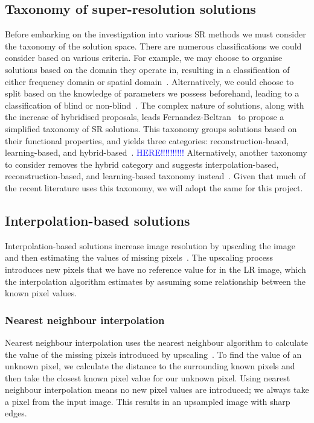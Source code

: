 \subsection{Taxonomy of super-resolution solutions}
Before embarking on the investigation into various SR methods we must consider the taxonomy of the solution space. There are numerous classifications we could consider based on various criteria. For example, we may choose to organise solutions based on the domain they operate in, resulting in a classification of either frequency domain or spatial domain~\cite{superResRemoteSensingOverview}. Alternatively, we could choose to split based on the knowledge of parameters we possess beforehand, leading to a classification of blind or non-blind~\cite{superResRemoteSensingOverview}. The complex nature of solutions, along with the increase of hybridised proposals, leads Fernandez-Beltran \etal\ to propose a simplified taxonomy of SR solutions. This taxonomy groups solutions based on their functional properties, and yields three categories: reconstruction-based, learning-based, and hybrid-based~\cite{superResRemoteSensingOverview}. \textcolor{blue}{HERE!!!!!!!!!!} Alternatively, another taxonomy to consider removes the hybrid category and suggests interpolation-based, reconstruction-based, and learning-based taxonomy instead~\cite{remoteSensingDeepLearningReview, remoteSensingGANsReview, isrgan, tesagan}. Given that much of the recent literature uses this taxonomy, we will adopt the same for this project.

\subsection{Interpolation-based solutions}
Interpolation-based solutions increase image resolution by upscaling the image and then estimating the values of missing pixels~\cite{interpolation}. The upscaling process introduces new pixels that we have no reference value for in the LR image, which the interpolation algorithm estimates by assuming some relationship between the known pixel values. 

\subsubsection{Nearest neighbour interpolation}
Nearest neighbour interpolation uses the nearest neighbour algorithm to calculate the value of the missing pixels introduced by upscaling~\cite{nnInterpolation}. To find the value of an unknown pixel, we calculate the distance to the surrounding known pixels and then take the closest known pixel value for our unknown pixel. Using nearest neighbour interpolation means no new pixel values are introduced; we always take a pixel from the input image. This results in an upsampled image with sharp edges.

